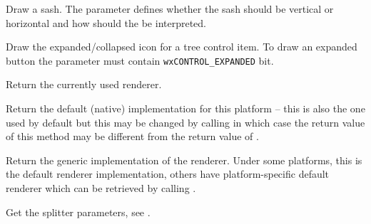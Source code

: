 
Draw a sash. The  parameter defines whether the sash should be
vertical or horizontal and how should the  be interpreted.


\label{wxrenderernativedrawtreeitembutton}


Draw the expanded/collapsed icon for a tree control item. To draw an expanded
button the  parameter must contain {\tt wxCONTROL\_EXPANDED} bit.


\label{wxrenderernativeget}


Return the currently used renderer.


\label{wxrenderernativegetdefault}


Return the default (native) implementation for this platform -- this is also
the one used by default but this may be changed by calling 
 in which case the return value of this
method may be different from the return value of .


\label{wxrenderernativegetgeneric}


Return the generic implementation of the renderer. Under some platforms, this
is the default renderer implementation, others have platform-specific default
renderer which can be retrieved by calling .


\label{wxrenderernativegetsplitterparams}


Get the splitter parameters, see 
.


